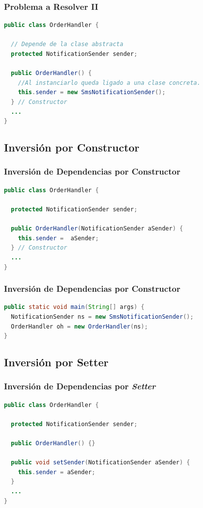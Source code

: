 \documentclass[handout,a4paper,t,xcolor=pst,dvips,colortheme]{beamer}
\begin{document}
\begin{frame}[c,fragile]
	\frametitle{Problema a Resolver II}
\begin{lstlisting}[basicstyle=\footnotesize,language=Java]
public class OrderHandler {

  // Depende de la clase abstracta
  protected NotificationSender sender;

  public OrderHandler() {
    //Al instanciarlo queda ligado a una clase concreta.
    this.sender = new SmsNotificationSender();
  } // Constructor
  ...
}
\end{lstlisting}
\end{frame}

\subsection{Inversión por Constructor}

\begin{frame}[c,fragile]
	\frametitle{Inversión de Dependencias por Constructor}
\begin{lstlisting}[basicstyle=\footnotesize,language=Java]
public class OrderHandler {

  protected NotificationSender sender;
	
  public OrderHandler(NotificationSender aSender) {
	this.sender =  aSender;
  } // Constructor
  ...
}
\end{lstlisting}
\end{frame}

\begin{frame}[c,fragile]
	\frametitle{Inversión de Dependencias por Constructor}
\begin{lstlisting}[basicstyle=\footnotesize,language=Java]
public static void main(String[] args) {
  NotificationSender ns = new SmsNotificationSender();
  OrderHandler oh = new OrderHandler(ns);
}
\end{lstlisting}
\end{frame}

\subsection{Inversión por Setter}

\begin{frame}[c,fragile]
	\frametitle{Inversión de Dependencias por \emph{Setter}}
\begin{lstlisting}[basicstyle=\footnotesize,language=Java]
public class OrderHandler {

  protected NotificationSender sender;
	
  public OrderHandler() {}
	
  public void setSender(NotificationSender aSender) {
    this.sender = aSender;
  }
  ...
}
\end{lstlisting}
\end{frame}
\end{document}

